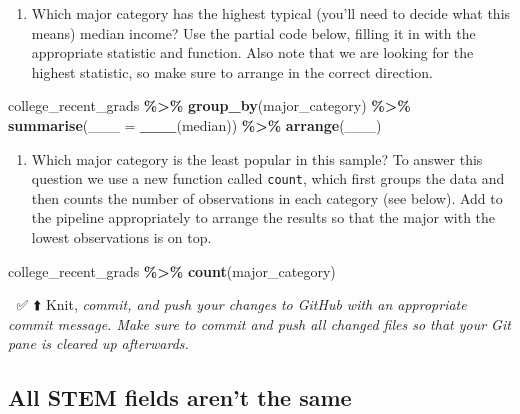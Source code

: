 \documentclass[
]{article}
\newenvironment{Shaded}{\begin{snugshade}}{\end{snugshade}}
\newcommand{\AttributeTok}[1]{\textcolor[rgb]{0.13,0.29,0.53}{#1}}
\newcommand{\FunctionTok}[1]{\textcolor[rgb]{0.13,0.29,0.53}{\textbf{#1}}}
\newcommand{\NormalTok}[1]{#1}
\newcommand{\SpecialCharTok}[1]{\textcolor[rgb]{0.81,0.36,0.00}{\textbf{#1}}}
\providecommand{\tightlist}{%
  \setlength{\itemsep}{0pt}\setlength{\parskip}{0pt}}
\begin{document}
\begin{enumerate}
\def\labelenumi{\arabic{enumi}.}
\setcounter{enumi}{5}
\tightlist
\item
  Which major category has the highest typical (you'll need to decide
  what this means) median income? Use the partial code below, filling it
  in with the appropriate statistic and function. Also note that we are
  looking for the highest statistic, so make sure to arrange in the
  correct direction.
\end{enumerate}

\begin{Shaded}
\begin{Highlighting}[]
\NormalTok{college\_recent\_grads }\SpecialCharTok{\%\textgreater{}\%}
  \FunctionTok{group\_by}\NormalTok{(major\_category) }\SpecialCharTok{\%\textgreater{}\%}
  \FunctionTok{summarise}\NormalTok{(}\AttributeTok{\_\_\_ =} \FunctionTok{\_\_\_}\NormalTok{(median)) }\SpecialCharTok{\%\textgreater{}\%}
  \FunctionTok{arrange}\NormalTok{(\_\_\_)}
\end{Highlighting}
\end{Shaded}

\begin{enumerate}
\def\labelenumi{\arabic{enumi}.}
\setcounter{enumi}{6}
\tightlist
\item
  Which major category is the least popular in this sample? To answer
  this question we use a new function called \texttt{count}, which first
  groups the data and then counts the number of observations in each
  category (see below). Add to the pipeline appropriately to arrange the
  results so that the major with the lowest observations is on top.
\end{enumerate}

\begin{Shaded}
\begin{Highlighting}[]
\NormalTok{college\_recent\_grads }\SpecialCharTok{\%\textgreater{}\%}
  \FunctionTok{count}\NormalTok{(major\_category)}
\end{Highlighting}
\end{Shaded}

🧶 ✅ ⬆️ Knit, \emph{commit, and push your changes to GitHub with an
appropriate commit message. Make sure to commit and push all changed
files so that your Git pane is cleared up afterwards.}

\subsection{All STEM fields aren't the
same}\label{all-stem-fields-arent-the-same}
\end{document}
